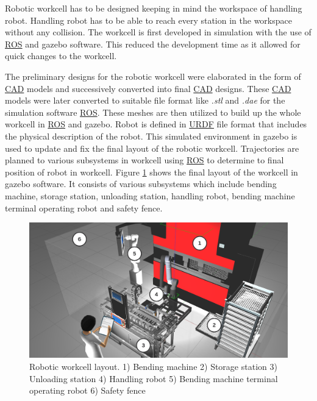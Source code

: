 
Robotic workcell has to be designed keeping in mind the workspace of handling robot. Handling robot has to be able to reach every station in the workspace without any collision. 
The workcell is first developed in simulation with the use of \hyperref[acro:ROS]{ROS} and gazebo software. This reduced the development time as it allowed for quick changes to the workcell.

The preliminary designs for the robotic workcell were elaborated
in the form of \hyperref[acro:CAD]{CAD} models and successively converted into final \hyperref[acro:CAD]{CAD} designs. 
These \hyperref[acro:CAD]{CAD} models were later converted to suitable file format like \textit{.stl} and \textit{.dae} for the simulation software \hyperref[acro:ROS]{ROS}.
These meshes are then utilized to build up the whole workcell in \hyperref[acro:ROS]{ROS} and gazebo. Robot is defined in \hyperref[acro:URDF]{URDF} file format that includes
the physical description of the robot. \cite{urdf} This simulated environment in gazebo is used to update and fix the final layout of the robotic workcell.
Trajectories are planned to various subsystems in workcell using \hyperref[acro:ROS]{ROS} to determine to final position of robot in workcell.
Figure \ref{fig:robotic-workcell} shows the final layout of the workcell in gazebo software.
It consists of various subsystems which include bending machine, storage station, unloading station, handling robot, bending machine terminal operating robot and safety fence.

\begin{figure}[h]
    \centering
    \includegraphics[width=\textwidth]{figures/robotic-workcell1.png}
    \caption{Robotic workcell layout. 1) Bending machine 2) Storage station 3) Unloading station 4) Handling robot 5) Bending machine terminal operating robot 6) Safety fence}
    \label{fig:robotic-workcell}
\end{figure}

